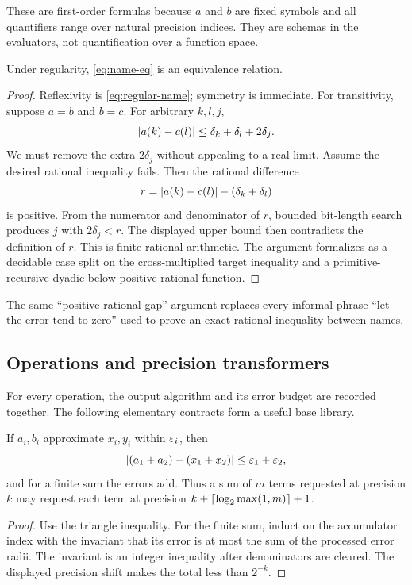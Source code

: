 These are first-order formulas because \(a\) and \(b\) are fixed symbols and
all quantifiers range over natural precision indices.  They are schemas in the
evaluators, not quantification over a function space.

\begin{lemma}
\label{lem:name-eq-trans}
Under regularity, \eqref{eq:name-eq} is an equivalence relation.
\end{lemma}

\begin{proof}
Reflexivity is \eqref{eq:regular-name}; symmetry is immediate.  For
transitivity, suppose \(a=b\) and \(b=c\).  For arbitrary \(k,l,j\),
\[
 \left|a(k)-c(l)\right|
 \le \delta_k+\delta_l+2\delta_j.
\]
We must remove the extra \(2\delta_j\) without appealing to a real limit.
Assume the desired rational inequality fails.  Then the rational difference
\[
 r=\left|a(k)-c(l)\right|-(\delta_k+\delta_l)
\]
is positive.  From the numerator and denominator of \(r\), bounded bit-length
search produces \(j\) with \(2\delta_j<r\).  The displayed upper bound then
contradicts the definition of \(r\).  This is finite rational arithmetic.  The
argument formalizes as a decidable case split on the cross-multiplied target
inequality and a primitive-recursive dyadic-below-positive-rational function.
\end{proof}

The same ``positive rational gap'' argument replaces every informal phrase
``let the error tend to zero'' used to prove an exact rational inequality
between names.

\subsection{Operations and precision transformers}

For every operation, the output algorithm and its error budget are recorded
together.  The following elementary contracts form a useful base library.

\begin{lemma}
If \(a_i,b_i\) approximate \(x_i,y_i\) within \(\varepsilon_i\), then
\[
 \left|(a_1+a_2)-(x_1+x_2)\right|\le\varepsilon_1+\varepsilon_2,
\]
and for a finite sum the errors add.  Thus a sum of \(m\) terms requested at
precision \(k\) may request each term at precision
\(k+\left\lceil\log_2\max(1,m)\right\rceil+1\).
\end{lemma}

\begin{proof}
Use the triangle inequality.  For the finite sum, induct on the accumulator
index with the invariant that its error is at most the sum of the processed
error radii.  The invariant is an integer inequality after denominators are
cleared.  The displayed precision shift makes the total less than
\(2^{-k}\).
\end{proof}

